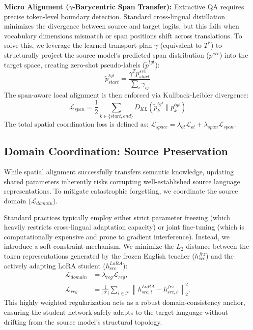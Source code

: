 \documentclass[11pt]{article}
\begin{document}
\textbf{Micro Alignment ($\gamma$-Barycentric Span Transfer):} Extractive QA requires precise token-level boundary detection. Standard cross-lingual distillation minimizes the divergence between source and target logits, but this fails when vocabulary dimensions mismatch or span positions shift across translations. To solve this, we leverage the learned transport plan $\gamma$ (equivalent to $T^*$) to structurally project the source model's predicted span distribution ($p^{src}$) into the target space, creating zero-shot pseudo-labels ($\tilde{p}^{tgt}$):
$$ \tilde{p}^{tgt}_{start} = \frac{\gamma^T p^{src}_{start}}{\sum_i \gamma_{ij}} $$
The span-aware local alignment is then enforced via Kullback-Leibler divergence:
$$ \mathcal{L}_{span} = \frac{1}{2} \sum_{k \in \{start, end\}} D_{KL}(\tilde{p}^{tgt}_{k} \| p^{tgt}_{k}) $$
The total spatial coordination loss is defined as: $\mathcal{L}_{space} = \lambda_{ot}\mathcal{L}_{ot} + \lambda_{span}\mathcal{L}_{span}$.

\subsection{Domain Coordination: Source Preservation}
\label{sec:domain}
While spatial alignment successfully transfers semantic knowledge, updating shared parameters inherently risks corrupting well-established source language representations. To mitigate catastrophic forgetting, we coordinate the source domain ($\mathcal{L}_{domain}$).

Standard practices typically employ either strict parameter freezing (which heavily restricts cross-lingual adaptation capacity) or joint fine-tuning (which is computationally expensive and prone to gradient interference). Instead, we introduce a soft constraint mechanism. We minimize the $L_2$ distance between the token representations generated by the frozen English teacher ($h^{frz}_{src}$) and the actively adapting LoRA student ($h^{LoRA}_{src}$):
\[
\begin{aligned}
\mathcal{L}_{domain} &= \lambda_{reg}\mathcal{L}_{reg}, \\
\mathcal{L}_{reg} &= \frac{1}{|\mathcal{T}|}
\sum_{i \in \mathcal{T}}
\left\|h^{LoRA}_{src,i} - h^{frz}_{src,i}\right\|^2_2.
\end{aligned}
\]
This highly weighted regularization acts as a robust domain-consistency anchor, ensuring the student network safely adapts to the target language without drifting from the source model's structural topology.
\end{document}
